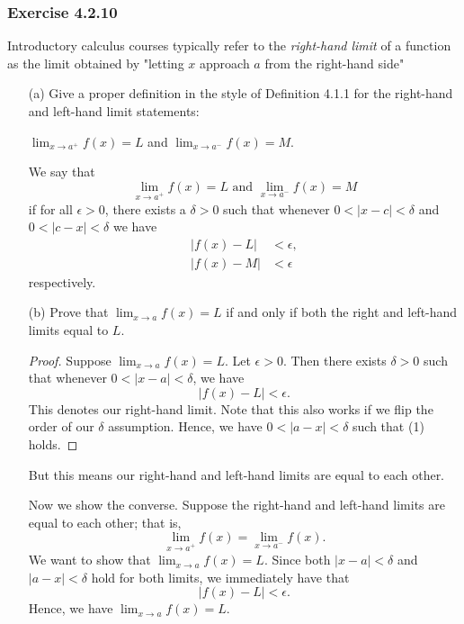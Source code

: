 \subsubsection{Exercise 4.2.10}

Introductory calculus courses typically refer to the \textit{right-hand limit} of a function as the limit obtained by "letting \( x \) approach \( a \) from the right-hand side"

\begin{enumerate}
    \item[(a)] Give a proper definition in the style of Definition 4.1.1 for the right-hand and left-hand limit statements: 

        \begin{center}
            \( \lim_{ x \to a^{+} } f(x) = L  \) and \( \lim_{ x \to a^{-} } f(x) = M. \) 
        \end{center}
        \begin{tcolorbox}
        \begin{defn}
        We say that
        \[ \lim_{ x \to a^{+}  } f(x) = L  \text{~and~} \lim_{ x \to a^{-} } f(x) = M  \]  
        if for all \( \epsilon > 0  \), there exists a \(  \delta > 0 \) such that whenever \( 0 < | x - c  | < \delta \)  and \( 0 < | c - x  | < \delta  \) we have 
        \begin{align*}
            | f(x) - L  | &< \epsilon, \\
            | f(x) - M  | &< \epsilon
        \end{align*}
        respectively.
        \end{defn}
        \end{tcolorbox}
    \item[(b)] Prove that \( \lim_{ x \to a } f(x) = L  \) if and only if both the right and left-hand limits equal to \( L  \).
        \begin{proof}
        Suppose \( \lim_{ x \to a } f(x) = L  \). Let \( \epsilon > 0  \). Then there exists \( \delta > 0  \) such that whenever \( 0 < | x - a  | < \delta  \), we have 
        \[ | f(x) - L  | < \epsilon. \tag{1} \]
        This denotes our right-hand limit. Note that this also works if we flip the order of our \( \delta \) assumption. Hence, we have \( 0 < | a - x  | < \delta \) such that (1) holds. 
        \end{proof}
        But this means our right-hand and left-hand limits are equal to each other.

        Now we show the converse. Suppose the right-hand and left-hand limits are equal to each other; that is, 
        \[ \lim_{ x \to a^{+}  } f(x) = \lim_{ x \to a^{-}  } f(x).\]
        We want to show that \( \lim_{ x \to a } f(x) = L  \). Since both \( | x - a  | < \delta \) and \( | a - x   | < \delta  \) hold for both limits, we immediately have that 
        \[  | f(x) - L  | < \epsilon. \]
        Hence, we have \( \lim_{ x \to a } f(x) = L  \).
\end{enumerate}




